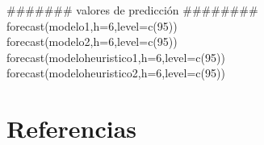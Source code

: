 \documentclass{report}
\begin{document}
\#\#\#\#\#\#\# valores de predicción \#\#\#\#\#\#\#\# \\
forecast(modelo1,h=6,level=c(95))\\
forecast(modelo2,h=6,level=c(95))\\
forecast(modeloheuristico1,h=6,level=c(95))\\
forecast(modeloheuristico2,h=6,level=c(95))\\

\chapter{Referencias}\label{Referencias}


%

\end{document}
